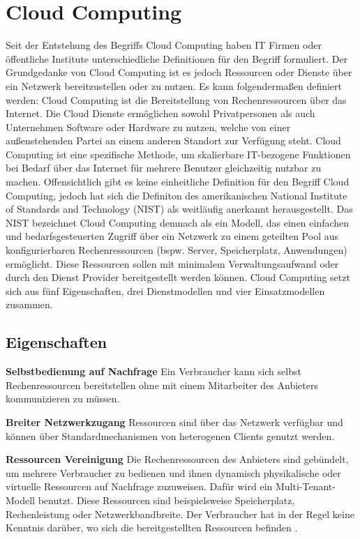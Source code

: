\section{Cloud Computing}
Seit der Entstehung des Begriffs \glqq Cloud Computing\grqq{} haben IT Firmen oder öffentliche Institute unterschiedliche Definitionen für den Begriff formuliert. Der Grundgedanke von Cloud Computing ist es jedoch Ressourcen oder Dienste über ein Netzwerk bereitzustellen oder zu nutzen. Es kann folgendermaßen definiert werden: Cloud Computing ist die Bereitstellung von Rechenressourcen über das Internet. Die Cloud Dienste ermöglichen sowohl Privatpersonen als auch Unternehmen Software oder Hardware zu nutzen, welche von einer außenstehenden Partei an einem anderen Standort zur Verfügung steht\cite{canada}. Cloud Computing ist eine spezifische Methode, um skalierbare IT-bezogene Funktionen bei Bedarf über das Internet für mehrere Benutzer gleichzeitig nutzbar zu machen\cite{gartner}.
Offensichtlich gibt es keine einheitliche Definition für den Begriff \glqq Cloud Computing\grqq, jedoch hat sich die Definiton des amerikanischen National Institute of Standards and Technology (NIST) als weitläufig anerkannt herausgestellt. Das NIST bezeichnet Cloud Computing demnach als ein Modell, das einen einfachen und bedarfsgesteuerten Zugriff über ein Netzwerk zu einem geteilten Pool aus konfigurierbaren Rechenressourcen (bspw. Server, Speicherplatz, Anwendungen) ermöglicht. Diese Ressourcen sollen mit minimalem Verwaltungsaufwand oder durch den Dienst Provider bereitgestellt werden können. Cloud Computing setzt sich aus fünf Eigenschaften, drei Dienstmodellen und vier Einsatzmodellen zusammen\cite{nist_definition}.

\subsection{Eigenschaften}

\textbf{Selbstbedienung auf Nachfrage} 
Ein Verbraucher kann sich selbst Rechenressourcen bereitstellen ohne mit einem Mitarbeiter des Anbieters kommunizieren zu müssen\cite{nist_definition}.

\textbf{Breiter Netzwerkzugang}
Ressourcen sind über das Netzwerk verfügbar und können über Standardmechanismen von heterogenen Clients genutzt werden\cite{nist_definition}.

\textbf{Ressourcen Vereinigung}
Die Rechenressourcen des Anbieters sind gebündelt, um mehrere Verbraucher zu bedienen und ihnen dynamisch physikalische oder virtuelle Ressourcen auf Nachfrage zuzuweisen. Dafür wird ein Multi-Tenant-Modell benutzt. Diese Ressourcen sind beispielsweise Speicherplatz, Rechenleistung oder Netzwerkbandbreite. Der Verbraucher hat in der Regel keine Kenntnis darüber, wo sich die bereitgestellten Ressourcen befinden \cite{nist_definition}.


